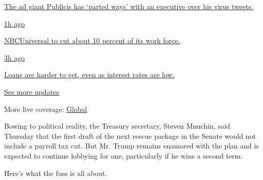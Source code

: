 \href{https://www.nytimes3xbfgragh.onion/live/2020/08/04/business/stock-market-today-coronavirus?action=click\&pgtype=Article\&state=default\&region=MAIN_CONTENT_1\&context=storylines_live_updates\#the-ad-giant-publicis-has-parted-ways-with-an-executive-over-his-virus-tweets}{The
ad giant Publicis has `parted ways' with an executive over his virus
tweets.}

\href{https://www.nytimes3xbfgragh.onion/live/2020/08/04/business/stock-market-today-coronavirus?action=click\&pgtype=Article\&state=default\&region=MAIN_CONTENT_1\&context=storylines_live_updates\#nbcuniversal-to-cut-about-10-percent-of-its-work-force}{1h
ago}

\href{https://www.nytimes3xbfgragh.onion/live/2020/08/04/business/stock-market-today-coronavirus?action=click\&pgtype=Article\&state=default\&region=MAIN_CONTENT_1\&context=storylines_live_updates\#nbcuniversal-to-cut-about-10-percent-of-its-work-force}{NBCUniversal
to cut about 10 percent of its work force.}

\href{https://www.nytimes3xbfgragh.onion/live/2020/08/04/business/stock-market-today-coronavirus?action=click\&pgtype=Article\&state=default\&region=MAIN_CONTENT_1\&context=storylines_live_updates\#loans-are-harder-to-get-even-as-interest-rates-are-low}{3h
ago}

\href{https://www.nytimes3xbfgragh.onion/live/2020/08/04/business/stock-market-today-coronavirus?action=click\&pgtype=Article\&state=default\&region=MAIN_CONTENT_1\&context=storylines_live_updates\#loans-are-harder-to-get-even-as-interest-rates-are-low}{Loans
are harder to get, even as interest rates are low.}

\href{https://www.nytimes3xbfgragh.onion/live/2020/08/04/business/stock-market-today-coronavirus?action=click\&pgtype=Article\&state=default\&region=MAIN_CONTENT_1\&context=storylines_live_updates}{See
more updates}

More live coverage:
\href{https://www.nytimes3xbfgragh.onion/2020/08/04/world/coronavirus-cases.html?action=click\&pgtype=Article\&state=default\&region=MAIN_CONTENT_1\&context=storylines_live_updates}{Global}

Bowing to political reality, the Treasury secretary, Steven Mnuchin,
said Thursday that the first draft of the next rescue package in the
Senate would not include a payroll tax cut. But Mr. Trump remains
enamored with the plan and is expected to continue lobbying for one,
particularly if he wins a second term.

Here's what the fuss is all about.

